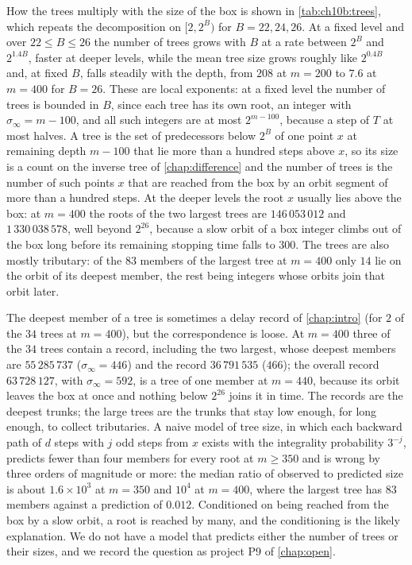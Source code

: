 How the trees multiply with the size of the box is shown in
\cref{tab:ch10b:trees}, which repeats the decomposition on $[2,2^B)$ for
$B=22,24,26$. At a fixed level and over $22\le B\le26$ the number of trees grows with $B$ at a rate
between $2^{B}$ and $2^{1.4B}$, faster at deeper levels, while the mean tree
size grows roughly like $2^{0.4B}$ and, at fixed $B$, falls steadily with the depth,
from $208$ at $m=200$ to $7.6$ at $m=400$ for $B=26$.
These are local exponents: at a fixed level the number of trees is bounded in $B$, since each tree has its own root, an integer with $\sigma_\infty=m-100$, and all such integers are at most $2^{m-100}$, because a step of $T$ at most halves.
A tree is the set of
predecessors below $2^B$ of one point $x$ at remaining depth $m-100$ that lie
more than a hundred steps above $x$, so its size is a count on the inverse tree
of \cref{chap:difference} and the number of trees is the number of such points
$x$ that are reached from the box by an orbit segment of more than a hundred steps. At the deeper levels the root $x$ usually lies above the box: at $m=400$ the roots of the two largest trees are
$146\,053\,012$ and $1\,330\,038\,578$, well beyond $2^{26}$, because a slow
orbit of a box integer climbs out of the box long before its remaining stopping
time falls to $300$. The trees are also mostly tributary: of the $83$ members
of the largest tree at $m=400$ only $14$ lie on the orbit of its deepest member,
the rest being integers whose orbits join that orbit later.

The deepest member of a tree is sometimes a delay record of \cref{chap:intro} (for $2$ of the $34$ trees at $m=400$), but
the correspondence is loose. At $m=400$ three of the $34$ trees contain a
record, including the two largest, whose deepest members are $55\,285\,737$
($\sigma_\infty=446$) and the record $36\,791\,535$ ($466$); the overall
record $63\,728\,127$, with $\sigma_\infty=592$, is a tree of one member at
$m=440$, because its orbit leaves the box at once and nothing below $2^{26}$
joins it in time. The records are the deepest trunks; the large trees are the
trunks that stay low enough, for long enough, to collect tributaries. A naive
model of tree size, in which each backward path of $d$ steps with $j$ odd
steps from $x$ exists with the integrality probability $3^{-j}$, predicts
fewer than four members for every root at $m\ge350$ and is wrong by three orders of magnitude or more: the median ratio of observed to predicted size is about $1.6\times10^3$ at $m=350$ and $10^4$ at $m=400$, where the largest tree has $83$ members against a prediction of $0.012$. Conditioned on being reached from the box by a slow orbit, a
root is reached by many, and the conditioning is the likely explanation. We do not
have a model that predicts either the number of trees or their sizes, and we
record the question as project P9 of \cref{chap:open}.

